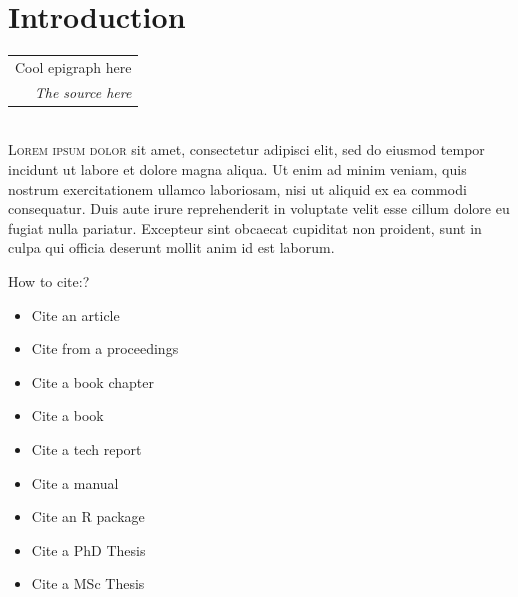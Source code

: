 \documentclass{unicam_thesis}
\makeatletter
\newlength\epirule%
\newcommand\epiline{%
\noalign{\global\epirule\arrayrulewidth\global\arrayrulewidth 1pt}\hline%
\noalign{\global\arrayrulewidth\epirule}%
}
\newcommand\myepigraph[2]{%
\hfill\begin{tabular}{@{}r@{}}
#1\\[.5em] \epiline%
#2
\end{tabular}
\\[1em]
}
\theoremstyle{definition} \newtheorem{esempio}{Esempio}[chapter]
\theoremstyle{definition}
\makeatother
\begin{document}
    
    
    
    \mainmatter
 
     
    
    
    \chapter{Introduction}
    \label{chap:intro}
    
    \myepigraph{Cool epigraph here}{\textit{The source here}}
    
    \textsc{Lorem ipsum dolor} sit amet, consectetur adipisci elit, sed do eiusmod tempor incidunt ut labore et dolore magna aliqua. Ut enim ad minim veniam, quis nostrum exercitationem ullamco laboriosam, nisi ut aliquid ex ea commodi consequatur. Duis aute irure reprehenderit in voluptate velit esse cillum dolore eu fugiat nulla pariatur. Excepteur sint obcaecat cupiditat non proident, sunt in culpa qui officia deserunt mollit anim id est laborum.
    
    
    How to cite:?
    \begin{itemize}
        \item Cite an article~\citep{kilic2021_3}
        \item  Cite from a proceedings~\citep{palatinus2010}
         \item  Cite a book chapter~\citep{binh2019}
          \item  Cite a book~\citep{gilli2019}
           \item  Cite a tech report~\citep{dot2013}
          \item  Cite a manual~\citep{concaveman2020}
          \item  Cite an R package~\citep{deoptim}
           \item  Cite a PhD Thesis~\citep{glock2020}
            \item  Cite a MSc Thesis~\citep{fenton16}
    \end{itemize}
    
\end{document}
